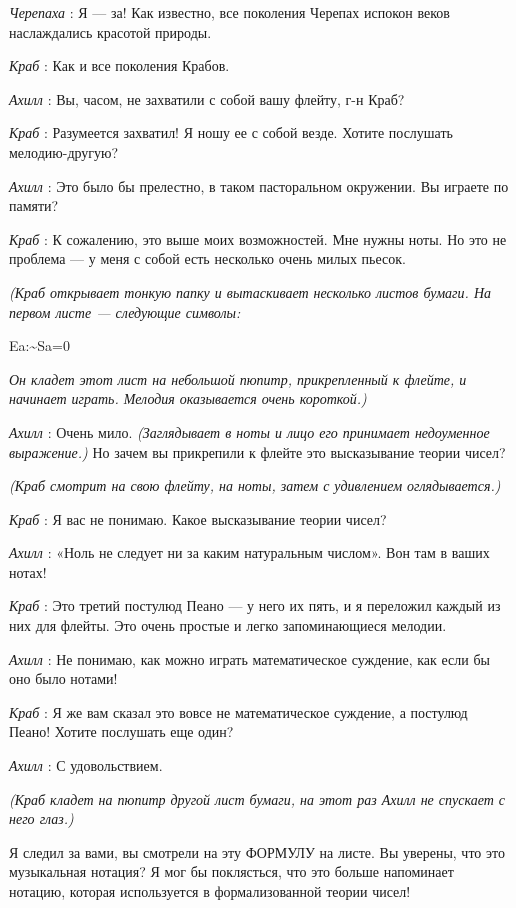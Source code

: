 \emph{Черепаха} : Я --- за! Как известно, все поколения Черепах испокон веков наслаждались красотой природы.

\emph{Краб} : Как и все поколения Крабов.

\emph{Ахилл} : Вы, часом, не захватили с собой вашу флейту, г-н Краб?

\emph{Краб} : Разумеется захватил! Я ношу ее с собой везде. Хотите послушать мелодию-другую?

\emph{Ахилл} : Это было бы прелестно, в таком пасторальном окружении. Вы играете по памяти?

\emph{Краб} : К сожалению, это выше моих возможностей. Мне нужны ноты. Но это не проблема --- у меня с собой есть несколько очень милых пьесок.

\emph{(Краб открывает тонкую папку и вытаскивает несколько листов бумаги. На первом листе --- следующие символы:}

Ea:\textasciitilde Sa=0

\emph{Он кладет этот лист на небольшой пюпитр, прикрепленный к флейте, и начинает играть. Мелодия оказывается очень короткой.)}

\emph{Ахилл} : Очень мило. \emph{(Заглядывает в ноты и лицо его принимает недоуменное выражение.)} Но зачем вы прикрепили к флейте это высказывание теории чисел?

\emph{(Краб смотрит на свою флейту, на ноты, затем с удивлением оглядывается.)}

\emph{Краб} : Я вас не понимаю. Какое высказывание теории чисел?

\emph{Ахилл} : «Ноль не следует ни за каким натуральным числом». Вон там в ваших нотах!

\emph{Краб} : Это третий постулюд Пеано --- у него их пять, и я переложил каждый из них для флейты. Это очень простые и легко запоминающиеся мелодии.

\emph{Ахилл} : Не понимаю, как можно играть математическое суждение, как если бы оно было нотами!

\emph{Краб} : Я же вам сказал это вовсе не математическое суждение, а постулюд Пеано! Хотите послушать еще один?

\emph{Ахилл} : С удовольствием.

\emph{(Краб кладет на пюпитр другой лист бумаги, на этот раз Ахилл не спускает с него глаз.)}

Я следил за вами, вы смотрели на эту ФОРМУЛУ на листе. Вы уверены, что это музыкальная нотация? Я мог бы поклясться, что это больше напоминает нотацию, которая используется в формализованной теории чисел!

